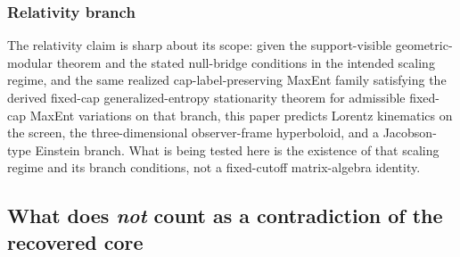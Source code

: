\documentclass[11pt]{article}
\begin{document}
\subsubsection{Relativity branch}

The relativity claim is sharp about its scope: given the support-visible geometric-modular theorem and the stated null-bridge conditions in the intended scaling regime, and the same realized cap-label-preserving MaxEnt family satisfying the derived fixed-cap generalized-entropy stationarity theorem for admissible fixed-cap MaxEnt variations on that branch, this paper predicts Lorentz kinematics on the screen, the three-dimensional observer-frame hyperboloid, and a Jacobson-type Einstein branch. What is being tested here is the existence of that scaling regime and its branch conditions, not a fixed-cutoff matrix-algebra identity.

\subsection{What does \emph{not} count as a contradiction of the recovered core}
\end{document}
